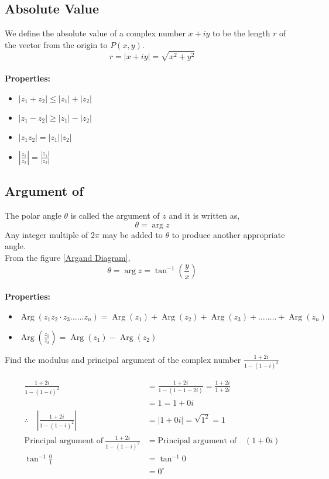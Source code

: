    \subsection{Absolute Value}
    We define the absolute value of a complex number $x+i y$ to be the length ${r}$ of the vector from the origin to $P(x, y)$. 
    $$
    r=|x+i y|=\sqrt{x^{2}+y^{2}}
    $$
    \\\textbf{Properties:}
    \begin{itemize}
    	\item $\left|z_{1}+z_{2}\right| \leq\left|z_{1}\right|+\left|z_{2}\right|$
    	\item $\left|z_{1}-z_{2}\right| \geq\left|z_{1}\right|-\left|z_{2}\right|$
    	\item $\left|z_{1} z_{2}\right|=\left|z_{1}\right|\left|z_{2}\right|$
    	\item $\left|\frac{z_{1}}{z_{2}}\right|=\frac{\left|z_{1}\right|}{\left|z_{2}\right|}$
    \end{itemize}
    \subsection{Argument of }
    The polar angle $\theta$ is called the {argument} of $z$ and it is written as, $${\theta=\arg z }$$ Any integer multiple of $2 \pi$ may be added to $\theta$ to produce another appropriate  angle.\\From the figure \ref{Argand Diagram},
    $${\theta=\arg z }=\tan ^{-1}\left(\frac{y}{x}\right)$$
    \\\textbf{Properties:}
    \begin{itemize}
    	\item $\operatorname{Arg}\left(z_{1}  z_{2} \cdot z_{3} \ldots \ldots z_{n}\right)=\operatorname{Arg} \left(z_{1}\right)+\operatorname{Arg}  \left(z_{2}\right)+\operatorname{Arg}  \left(z_{3}\right)+\ldots \ldots . .+\operatorname{Arg}\left(z_{n}\right)$
    	\item $\operatorname{Arg}\left(\frac{z_{1}}{z_{2}}\right)=\operatorname{Arg}\left(z_{1}\right)-\operatorname{Arg}\left(z_{2}\right)$
    \end{itemize}
\begin{exercise}
	Find the modulus and principal argument of the complex number
	$\frac{1+2 i}{1-(1-i)^{2}}$
\end{exercise}
\begin{answer}
	\begin{align*}
	\frac{1+2 i}{1-(1-i)^{2}}&=\frac{1+2 i}{1-(1-1-2 i)}=\frac{1+2 i}{1+2 i}\\&=1=1+0 i \\
	\therefore \quad\left|\frac{1+2 i}{1-(1-i)^{2}}\right|&=|1+0 i|=\sqrt{1^{2}}=1\\
	\text{Principal argument of}\ \frac{1+2 i}{1-(1-i)^{2}}&= \text{Principal argument of} \quad \left( 1+0 i\right) \\
	\tan ^{-1} \frac{0}{1}&=\tan ^{-1} 0\\&=0^{\circ}
	\end{align*}
\end{answer}
